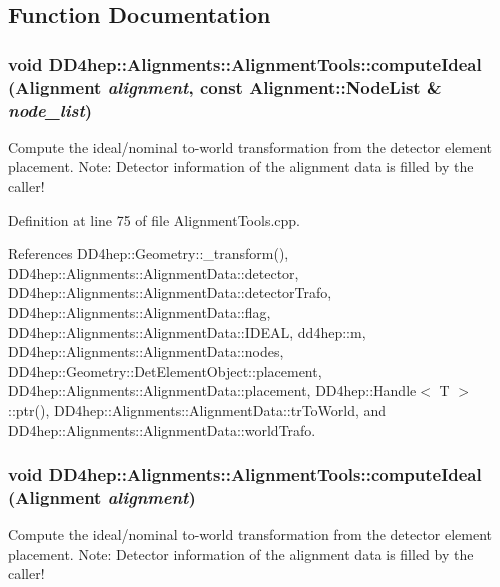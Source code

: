 \subsection{Function Documentation}
\hypertarget{namespace_d_d4hep_1_1_alignments_1_1_alignment_tools_a531f04a21638b77afa2f81378f5837cd}{
\subsubsection[{computeIdeal}]{\setlength{\rightskip}{0pt plus 5cm}void DD4hep::Alignments::AlignmentTools::computeIdeal ({\bf Alignment} {\em alignment}, \/  const Alignment::NodeList \& {\em node\_\-list})}}
\label{namespace_d_d4hep_1_1_alignments_1_1_alignment_tools_a531f04a21638b77afa2f81378f5837cd}


Compute the ideal/nominal to-\/world transformation from the detector element placement. Note: Detector information of the alignment data is filled by the caller! 

Definition at line 75 of file AlignmentTools.cpp.

References DD4hep::Geometry::\_\-transform(), DD4hep::Alignments::AlignmentData::detector, DD4hep::Alignments::AlignmentData::detectorTrafo, DD4hep::Alignments::AlignmentData::flag, DD4hep::Alignments::AlignmentData::IDEAL, dd4hep::m, DD4hep::Alignments::AlignmentData::nodes, DD4hep::Geometry::DetElementObject::placement, DD4hep::Alignments::AlignmentData::placement, DD4hep::Handle$<$ T $>$::ptr(), DD4hep::Alignments::AlignmentData::trToWorld, and DD4hep::Alignments::AlignmentData::worldTrafo.\hypertarget{namespace_d_d4hep_1_1_alignments_1_1_alignment_tools_a009dd48155bddca23afba151e2887124}{
\subsubsection[{computeIdeal}]{\setlength{\rightskip}{0pt plus 5cm}void DD4hep::Alignments::AlignmentTools::computeIdeal ({\bf Alignment} {\em alignment})}}
\label{namespace_d_d4hep_1_1_alignments_1_1_alignment_tools_a009dd48155bddca23afba151e2887124}


Compute the ideal/nominal to-\/world transformation from the detector element placement. Note: Detector information of the alignment data is filled by the caller! 

